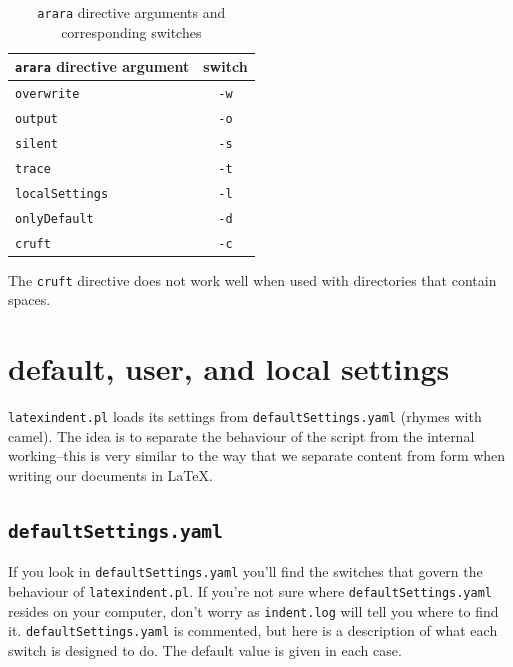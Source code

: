\documentclass[11pt]{article}
\begin{document}
\begin{table}[!ht]
	\centering
	\caption{\lstinline!arara! directive arguments and corresponding switches}
	\label{tab:orbsandswitches}
	\begin{tabular}{lc}
		\toprule
		\lstinline!arara! directive argument & switch         \\
		\midrule
		\lstinline!overwrite!                & \lstinline!-w! \\
		\lstinline!output!                   & \lstinline!-o! \\
		\lstinline!silent!                   & \lstinline!-s! \\
		\lstinline!trace!                    & \lstinline!-t! \\
		\lstinline!localSettings!            & \lstinline!-l! \\
		\lstinline!onlyDefault!              & \lstinline!-d! \\
		\lstinline!cruft!                    & \lstinline!-c! \\
		\bottomrule
	\end{tabular}
\end{table}

The \lstinline!cruft! directive does not work well when used with
directories that contain spaces.

\section{default, user, and local settings}\label{sec:defuseloc}
\lstinline!latexindent.pl! loads its settings from \lstinline!defaultSettings.yaml!
(rhymes with camel). The idea is to separate the behaviour of the script
from the internal working--this is very similar to the way that we separate content
from form when writing our documents in \LaTeX.

\subsection{\lstinline!defaultSettings.yaml!}
If you look in \lstinline!defaultSettings.yaml! you'll find the switches
that govern the behaviour of \lstinline!latexindent.pl!. If you're not sure where
\lstinline!defaultSettings.yaml! resides on your computer, don't worry as \lstinline!indent.log!
will tell you where to find it.
\lstinline!defaultSettings.yaml! is commented,
but here is a description of what each switch is designed to do. The default
value is given in each case.
\end{document}

